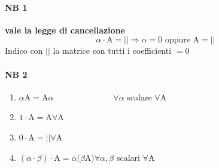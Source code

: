 \paragraph{NB 1} \textbf{vale la legge di cancellazione} \\
$$\alpha \cdot \textrm{A} = || \Longrightarrow \alpha=0\textrm{ oppure A}=||$$
Indico con $||$ la matrice con tutti i coefficienti $=0$
\paragraph{NB 2} 
\begin{enumerate} 
    \item $\alpha$A$=$A$\alpha \hspace{3cm}\forall\alpha$ scalare $\forall$A
    \item $1\cdot$A$=$A\hspace{3cm}$\forall$A
    \item $0\cdot$A$=||$\hspace{3cm}$\forall$A
    \item $(\alpha\cdot\beta)\cdot$A$=\alpha(\beta$A$)$\hspace{2cm}$\forall \alpha , \beta$ scalari
        $\forall$A
\end{enumerate} 

